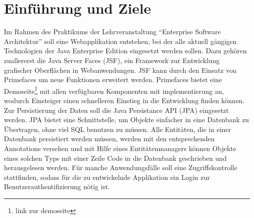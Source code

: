 \chapter{Einführung und Ziele}

Im Rahmen des Praktikums der Lehrveranstaltung \enquote{Enterprise Software Architektur} soll eine Webapplikation
entstehen, bei der alle aktuell gängigen Technologien der Java Enterprise Edition eingesetzt werden sollen. 
Dazu gehören zuallererst die Java Server Faces (JSF), ein Framework zur Entwicklung grafischer Oberflächen in Webanwendungen. 
JSF kann durch den Einsatz von Primefaces um neue Funktionen erweitert werden. Primefaces bietet eine Demoseite\footnote{link zur demoseite} mit allen
verfügbaren Komponenten mit implementierung an, wodurch Einsteiger einen schnelleren Einstieg in die Entwicklung finden können.
Zur Persistierung der Daten soll die Java Persistance API (JPA) eingesetzt werden. JPA bietet eine Schnittstelle, um Objekte einfacher
in eine Datenbank zu Übertragen, ohne viel SQL benutzen zu müssen. Alle Entitäten, die in einer Datenbank persistiert werden müssen,
werden mit den entsprechenden Annotations versehen und mit Hilfe eines Entitätenmanagers können Objekte eines solchen Typs
mit einer Zeile Code in die Datenbank geschrieben und herausgelesen werden. Für manche Anwendungsfälle soll eine Zugriffskontrolle stattfinden,
sodass für die zu entwickelnde Applikation ein Login zur Benutzerauthentifizierung nötig ist. 


